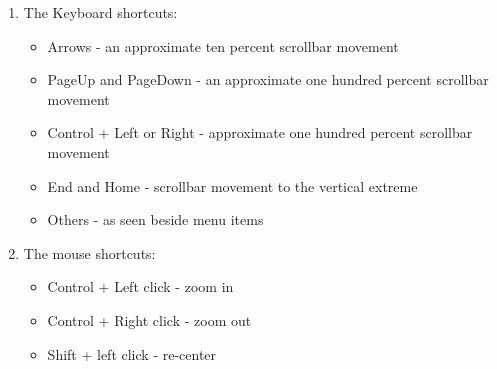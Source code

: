\begin{enumerate}
\item The Keyboard shortcuts: 

\begin{itemize}
\item Arrows - an approximate ten percent scrollbar movement
\item PageUp and PageDown - an approximate one hundred percent scrollbar movement 
\item Control + Left or Right - approximate one hundred percent scrollbar movement 
\item End and Home - scrollbar movement to the vertical extreme 
\item Others - as seen beside menu items
\end{itemize}

\item The mouse shortcuts: 

\begin{itemize}
\item Control + Left click - zoom in 
\item Control + Right click - zoom out
\item Shift + left click - re-center
\end{itemize}
\end{enumerate}
 


